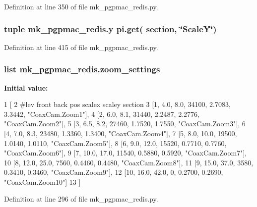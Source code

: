 Definition at line 350 of file mk\-\_\-pgpmac\-\_\-redis.\-py.

\hypertarget{namespacemk__pgpmac__redis_a34220d58136fb95853f54ed51a130f79}{
\subsubsection[{y}]{\setlength{\rightskip}{0pt plus 5cm}tuple mk\-\_\-pgpmac\-\_\-redis.\-y pi.\-get( section, \char`\"{}Scale\-Y\char`\"{})}}\label{namespacemk__pgpmac__redis_a34220d58136fb95853f54ed51a130f79}


Definition at line 415 of file mk\-\_\-pgpmac\-\_\-redis.\-py.

\hypertarget{namespacemk__pgpmac__redis_ad91bac9be746f99e1cf1f8e28ff348be}{
\subsubsection[{zoom\-\_\-settings}]{\setlength{\rightskip}{0pt plus 5cm}list mk\-\_\-pgpmac\-\_\-redis.\-zoom\-\_\-settings}}\label{namespacemk__pgpmac__redis_ad91bac9be746f99e1cf1f8e28ff348be}
{\bfseries Initial value\-:}
\begin{DoxyCode}
1 [
2     \textcolor{comment}{#lev   front  back  pos     scalex  scaley   section}
3     [1,     4.0,   8.0,  34100, 2.7083,  3.3442, \textcolor{stringliteral}{"CoaxCam.Zoom1"}],
4     [2,     6.0,   8.1,  31440, 2.2487,  2.2776, \textcolor{stringliteral}{"CoaxCam.Zoom2"}],
5     [3,     6.5,   8.2,  27460, 1.7520,  1.7550, \textcolor{stringliteral}{"CoaxCam.Zoom3"}],
6     [4,     7.0,   8.3,  23480, 1.3360,  1.3400, \textcolor{stringliteral}{"CoaxCam.Zoom4"}],
7     [5,     8.0,  10.0,  19500, 1.0140,  1.0110, \textcolor{stringliteral}{"CoaxCam.Zoom5"}],
8     [6,     9.0,  12.0,  15520, 0.7710,  0.7760, \textcolor{stringliteral}{"CoaxCam.Zoom6"}],
9     [7,    10.0,  17.0,  11540, 0.5880,  0.5920, \textcolor{stringliteral}{"CoaxCam.Zoom7"}],
10     [8,    12.0,  25.0,   7560, 0.4460,  0.4480, \textcolor{stringliteral}{"CoaxCam.Zoom8"}],
11     [9,    15.0,  37.0,   3580, 0.3410,  0.3460, \textcolor{stringliteral}{"CoaxCam.Zoom9"}],
12     [10,   16.0,  42.0,      0, 0.2700,  0.2690, \textcolor{stringliteral}{"CoaxCam.Zoom10"}]
13     ]
\end{DoxyCode}


Definition at line 296 of file mk\-\_\-pgpmac\-\_\-redis.\-py.

